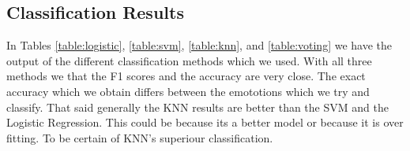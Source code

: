 \subsection{Classification Results}

In Tables \ref{table:logistic}, \ref{table:svm}, \ref{table:knn}, and \ref{table:voting}
we have the output of the different classification methods which we used.
With all three methods we that the F1 scores and the accuracy are very close.
The exact accuracy which we obtain differs between the emototions which we try and classify.
That said generally the KNN results are better than the SVM and the Logistic Regression.
This could be because its a better model or because it is over fitting.
To be certain of KNN's superiour classification.
